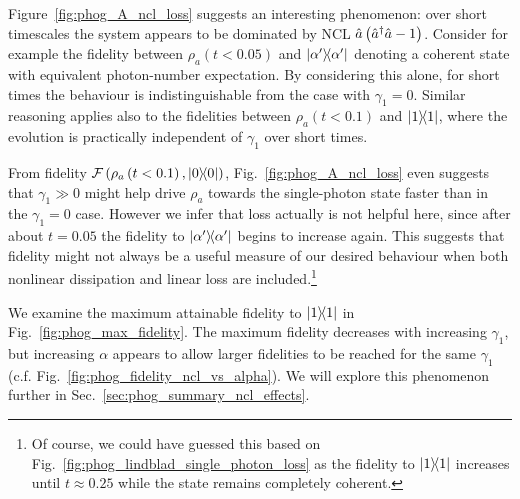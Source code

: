 Figure~\ref{fig:phog_A_ncl_loss} suggests an interesting phenomenon: over short timescales the system appears to be dominated by NCL $\hat{a}\left(\hat{a}^\dagger \hat{a} - 1\right)$. Consider for example the fidelity between $\rho_a\left(t < 0.05\right)$ and $\dyad{\alpha^\prime}$ denoting a coherent state with equivalent photon-number expectation. By considering this alone, for short times the behaviour is indistinguishable from the case with $\gamma_1 = 0$. Similar reasoning applies also to the fidelities between $\rho_a\left(t < 0.1\right)$ and $\dyad{1}$, where the evolution is practically independent of $\gamma_1$ over short times.

From fidelity $\mathcal{F}\left( \rho_a\left(t<0.1\right), \dyad{0}\right)$, Fig.~\ref{fig:phog_A_ncl_loss} even suggests that $\gamma_1 \gg 0$ might help drive $\rho_a$ towards the single-photon state faster than in the $\gamma_1 = 0$ case. However we infer that loss actually is not helpful here, since after about $t=0.05$ the fidelity to $\dyad{\alpha^\prime}$ begins to increase again. This suggests that fidelity might not always be a useful measure of our desired behaviour when both nonlinear dissipation and linear loss are included.\footnote{Of course, we could have guessed this based on Fig.~\ref{fig:phog_lindblad_single_photon_loss} as the fidelity to $\dyad{1}$ increases until $t\approx 0.25$ while the state remains completely coherent.}

We examine the maximum attainable fidelity to $\dyad{1}$ in Fig.~\ref{fig:phog_max_fidelity}. The maximum fidelity decreases with increasing $\gamma_1$, but increasing $\alpha$ appears to allow larger fidelities to be reached for the same $\gamma_1$ (c.f. Fig.~\ref{fig:phog_fidelity_ncl_vs_alpha}). We will explore this phenomenon further in Sec.~\ref{sec:phog_summary_ncl_effects}.


